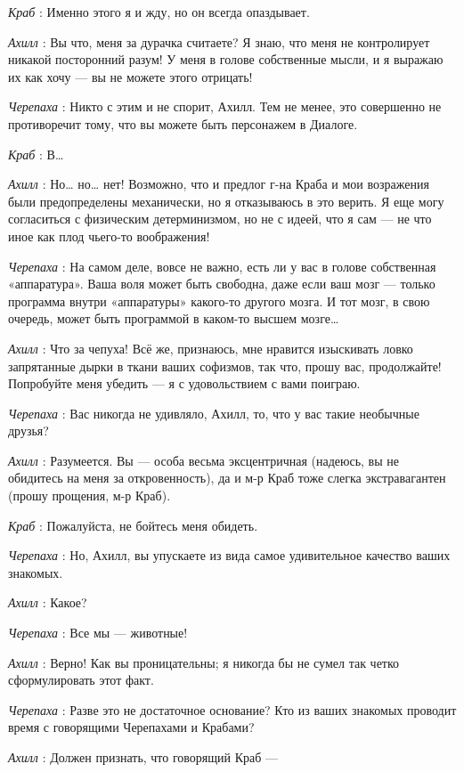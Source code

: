 \documentclass[../main.tex]{subfiles}
\begin{document}
\begin{dialogue}
\emph{Краб} : Именно этого я и жду, но он всегда опаздывает.

\emph{Ахилл} : Вы что, меня за дурачка считаете? Я знаю, что меня не контролирует никакой посторонний разум! У меня в голове собственные мысли, и я выражаю их как хочу --- вы не можете этого отрицать!

\emph{Черепаха} : Никто с этим и не спорит, Ахилл. Тем не менее, это совершенно не противоречит тому, что вы можете быть персонажем в Диалоге.

\emph{Краб} : В\ldots{}

\emph{Ахилл} : Но\ldots{} но\ldots{} нет! Возможно, что и предлог г-на Краба и мои возражения были предопределены механически, но я отказываюсь в это верить. Я еще могу согласиться с физическим детерминизмом, но не с идеей, что я сам --- не что иное как плод чьего-то воображения!

\emph{Черепаха} : На самом деле, вовсе не важно, есть ли у вас в голове собственная «аппаратура». Ваша воля может быть свободна, даже если ваш мозг --- только программа внутри «аппаратуры» какого-то другого мозга. И тот мозг, в свою очередь, может быть программой в каком-то высшем мозге\ldots{}

\emph{Ахилл} : Что за чепуха! Всё же, признаюсь, мне нравится изыскивать ловко запрятанные дырки в ткани ваших софизмов, так что, прошу вас, продолжайте! Попробуйте меня убедить --- я с удовольствием с вами поиграю.

\emph{Черепаха} : Вас никогда не удивляло, Ахилл, то, что у вас такие необычные друзья?

\emph{Ахилл} : Разумеется. Вы --- особа весьма эксцентричная (надеюсь, вы не обидитесь на меня за откровенность), да и м-р Краб тоже слегка экстравагантен (прошу прощения, м-р Краб).

\emph{Краб} : Пожалуйста, не бойтесь меня обидеть.

\emph{Черепаха} : Но, Ахилл, вы упускаете из вида самое удивительное качество ваших знакомых.

\emph{Ахилл} : Какое?

\emph{Черепаха} : Все мы --- животные!

\emph{Ахилл} : Верно! Как вы проницательны; я никогда бы не сумел так четко сформулировать этот факт.

\emph{Черепаха} : Разве это не достаточное основание? Кто из ваших знакомых проводит время с говорящими Черепахами и Крабами?

\emph{Ахилл} : Должен признать, что говорящий Краб ---


\end{dialogue}
\end{document}
